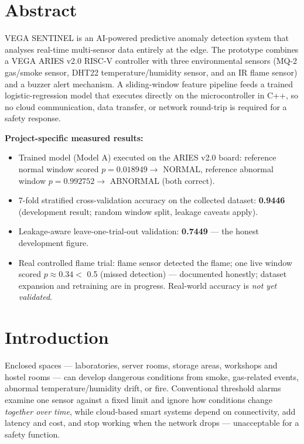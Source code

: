 \documentclass[11pt]{article}
\begin{document}
\section{Abstract}
VEGA SENTINEL is an AI-powered predictive anomaly detection system that
analyses real-time multi-sensor data entirely at the edge. The prototype
combines a VEGA ARIES v2.0 RISC-V controller with three environmental
sensors (MQ-2 gas/smoke sensor, DHT22 temperature/humidity sensor, and an
IR flame sensor) and a buzzer alert mechanism. A sliding-window
feature pipeline feeds a trained logistic-regression model that executes
directly on the microcontroller in C++, so no cloud communication, data
transfer, or network round-trip is required for a safety response.

\textbf{Project-specific measured results:}
\begin{itemize}[nosep]
  \item Trained model (Model A) executed on the ARIES v2.0 board:
        reference normal window scored
        $p = 0.018949 \rightarrow$ NORMAL, reference abnormal window
        $p = 0.992752 \rightarrow$ ABNORMAL (both correct).
  \item 7-fold stratified cross-validation accuracy on the collected
        dataset: \textbf{0.9446} (development result; random window
        split, leakage caveats apply).
  \item Leakage-aware leave-one-trial-out validation:
        \textbf{0.7449} --- the honest development figure.
  \item Real controlled flame trial: flame sensor detected the flame;
        one live window scored $p \approx 0.34 <$ 0.5 (missed detection)
        --- documented honestly; dataset expansion and retraining are
        in progress. Real-world accuracy is \emph{not yet validated}.
\end{itemize}

\section{Introduction}
Enclosed spaces --- laboratories, server rooms, storage areas, workshops
and hostel rooms --- can develop dangerous conditions from smoke,
gas-related events, abnormal temperature/humidity drift, or fire.
Conventional threshold alarms examine one sensor against a fixed limit
and ignore how conditions change \emph{together over time}, while
cloud-based smart systems depend on connectivity, add latency and cost,
and stop working when the network drops --- unacceptable for a safety
function.
\end{document}
